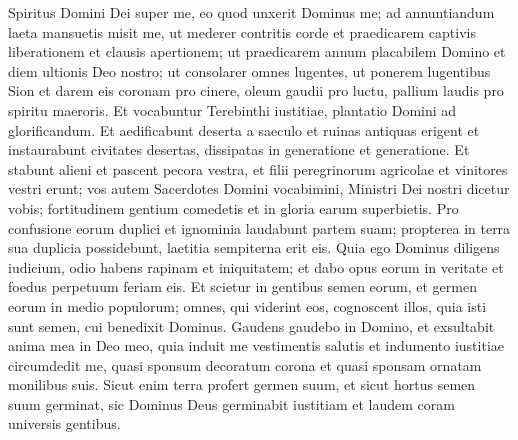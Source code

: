 \begin{biblechapter}  
\verse Spiritus Domini Dei super me, eo quod unxerit Dominus me; ad annuntiandum laeta mansuetis misit me, ut mederer contritis corde et praedicarem captivis liberationem et clausis apertionem; 
\verse ut praedicarem annum placabilem Domino et diem ultionis Deo nostro; ut consolarer omnes lugentes, 
\verse ut ponerem lugentibus Sion et darem eis coronam pro cinere, oleum gaudii pro luctu, pallium laudis pro spiritu maeroris. Et vocabuntur Terebinthi iustitiae, plantatio Domini ad glorificandum. 
\verse Et aedificabunt deserta a saeculo et ruinas antiquas erigent et instaurabunt civitates desertas, dissipatas in generatione et generatione. 
\verse Et stabunt alieni et pascent pecora vestra, et filii peregrinorum agricolae et vinitores vestri erunt; 
\verse vos autem Sacerdotes Domini vocabimini, Ministri Dei nostri dicetur vobis; fortitudinem gentium comedetis et in gloria earum superbietis. 
\verse Pro confusione eorum duplici et ignominia laudabunt partem suam; propterea in terra sua duplicia possidebunt, laetitia sempiterna erit eis. 
\verse Quia ego Dominus diligens iudicium, odio habens rapinam et iniquitatem; et dabo opus eorum in veritate et foedus perpetuum feriam eis. 
\verse Et scietur in gentibus semen eorum, et germen eorum in medio populorum; omnes, qui viderint eos, cognoscent illos, quia isti sunt semen, cui benedixit Dominus. 
\verse Gaudens gaudebo in Domino, et exsultabit anima mea in Deo meo, quia induit me vestimentis salutis et indumento iustitiae circumdedit me, quasi sponsum decoratum corona et quasi sponsam ornatam monilibus suis. 
\verse Sicut enim terra profert germen suum, et sicut hortus semen suum germinat, sic Dominus Deus germinabit iustitiam et laudem coram universis gentibus. 
\end{biblechapter}

